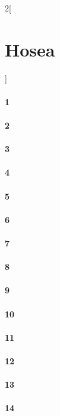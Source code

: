 \documentclass{book}
\begin{document}
\begin{multicols}{2}[\part{Hosea}]
\subsection*{1}
\subsection*{2}
\subsection*{3}
\subsection*{4}
\subsection*{5}
\subsection*{6}
\subsection*{7}
\subsection*{8}
\subsection*{9}
\subsection*{10}
\subsection*{11}
\subsection*{12}
\subsection*{13}
\subsection*{14}
\end{multicols}
\end{document}
